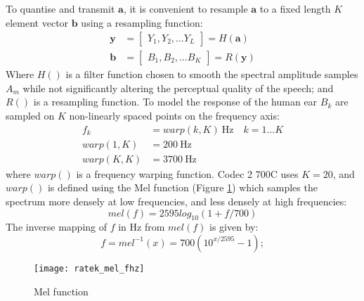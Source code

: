 \documentclass{article}
\begin{document}
To quantise and transmit $\mathbf{a}$, it is convenient to resample $\mathbf{a}$ to a fixed length $K$ element vector $\mathbf{b}$ using a resampling function:
\begin{equation}
\begin{split}
\mathbf{y} &= \begin{bmatrix} Y_1, Y_2, \ldots Y_L \end{bmatrix} = H(\mathbf{a}) \\
\mathbf{b} &= \begin{bmatrix} B_1, B_2, \ldots B_K \end{bmatrix} = R(\mathbf{y})
\end{split}
\end{equation}
Where $H()$ is a filter function chosen to smooth the spectral amplitude samples $A_m$ while not significantly altering the perceptual quality of the speech; and $R()$ is a resampling function. To model the response of the human ear $B_k$  are sampled on $K$ non-linearly spaced points on the frequency axis:
\begin{equation}
\begin{split}
f_k &= warp(k,K) \ \textrm{Hz} \quad k=1 \ldots K \\
warp(1,K) &= 200 \ \textrm{Hz} \\
warp(K,K) &= 3700 \ \textrm{Hz}
\end{split}
\end{equation}
where $warp()$ is a frequency warping function. Codec 2 700C uses $K=20$, and $warp()$ is defined using the Mel function \cite[p 150]{o1997human} (Figure \ref{fig:mel_fhz}) which samples the spectrum more densely at low frequencies, and less densely at high frequencies:
\begin{equation} \label{eq:mel_f}
mel(f) = 2595log_{10}(1+f/700)
\end{equation}
The inverse mapping of $f$ in Hz from $mel(f)$ is given by:
\begin{equation} \label{eq:f_mel}
f = mel^{-1}(x) = 700(10^{x/2595} - 1);
\end{equation}

\begin{figure}[h]
\caption{Mel function}
\label{fig:mel_fhz}
\begin{center}
\texttt{[image: ratek\_mel\_fhz]}
\end{center}
\end{figure}
\end{document}
